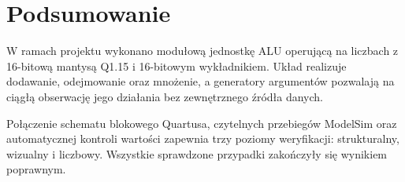 \documentclass[12pt,a4paper]{article}
\begin{document}
\section{Podsumowanie}

W ramach projektu wykonano modułową jednostkę ALU operującą na liczbach
z 16-bitową mantysą Q1.15 i 16-bitowym wykładnikiem. Układ realizuje
dodawanie, odejmowanie oraz mnożenie, a generatory argumentów pozwalają na
ciągłą obserwację jego działania bez zewnętrznego źródła danych.

Połączenie schematu blokowego Quartusa, czytelnych przebiegów ModelSim oraz
automatycznej kontroli wartości zapewnia trzy poziomy weryfikacji:
strukturalny, wizualny i liczbowy. Wszystkie sprawdzone przypadki zakończyły
się wynikiem poprawnym.
\end{document}
